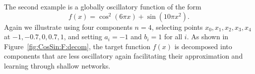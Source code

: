 \documentclass[review,hidelinks,onefignum,onetabnum]{siamart250211}
\begin{document}




The second example is a globally oscillatory function of the form
\[
f(x) = \cos^2(6\pi x) + \sin(10\pi x^2).
\]
Again we illustrate using four components $n=4$, selecting points $x_0, x_1, x_2, x_3, x_4$ at $-1, -0.7, 0, 0.7, 1$, and setting $a_i = -1$ and $b_i = 1$ for all $i$. As shown in Figure~\ref{fig:CosSin:F:decom}, the target function $f(x)$ is decomposed into components that are less oscillatory again facilitating their approximation and learning through shallow networks.
\end{document}

